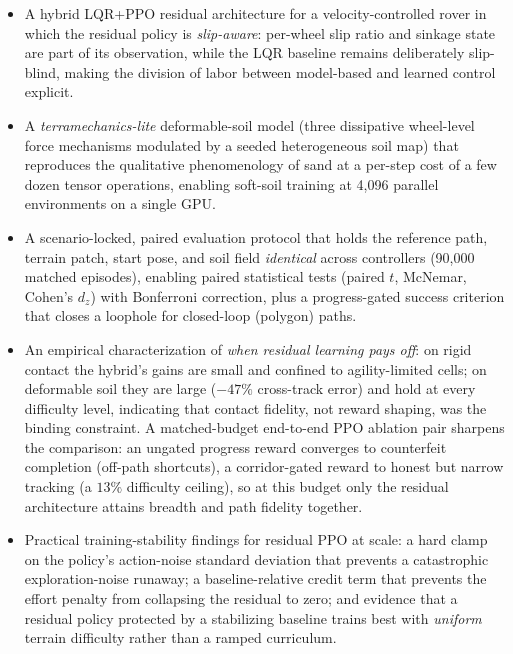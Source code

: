 \documentclass[conference]{IEEEtran}
\begin{document}
\begin{itemize}
  \item A hybrid LQR{+}PPO residual architecture for a velocity-controlled rover in which the residual policy is \emph{slip-aware}: per-wheel slip ratio and sinkage state are part of its observation, while the LQR baseline remains deliberately slip-blind, making the division of labor between model-based and learned control explicit.
  \item A \emph{terramechanics-lite} deformable-soil model (three dissipative wheel-level force mechanisms modulated by a seeded heterogeneous soil map) that reproduces the qualitative phenomenology of sand at a per-step cost of a few dozen tensor operations, enabling soft-soil training at 4{,}096 parallel environments on a single GPU.
  \item A scenario-locked, paired evaluation protocol that holds the reference path, terrain patch, start pose, and soil field \emph{identical} across controllers (90{,}000 matched episodes), enabling paired statistical tests (paired $t$, McNemar, Cohen's $d_z$) with Bonferroni correction, plus a progress-gated success criterion that closes a loophole for closed-loop (polygon) paths.
  \item An empirical characterization of \emph{when residual learning pays off}: on rigid contact the hybrid's gains are small and confined to agility-limited cells; on deformable soil they are large ($-47\%$ cross-track error) and hold at every difficulty level, indicating that contact fidelity, not reward shaping, was the binding constraint. A matched-budget end-to-end PPO ablation pair sharpens the comparison: an ungated progress reward converges to counterfeit completion (off-path shortcuts), a corridor-gated reward to honest but narrow tracking (a $13\%$ difficulty ceiling), so at this budget only the residual architecture attains breadth and path fidelity together.
  \item Practical training-stability findings for residual PPO at scale: a hard clamp on the policy's action-noise standard deviation that prevents a catastrophic exploration-noise runaway; a baseline-relative credit term that prevents the effort penalty from collapsing the residual to zero; and evidence that a residual policy protected by a stabilizing baseline trains best with \emph{uniform} terrain difficulty rather than a ramped curriculum.
\end{itemize}
\end{document}
